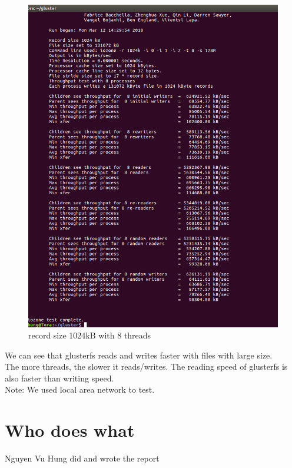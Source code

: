 \documentclass[12pt]{article}
\begin{document}
     \begin{figure}[H]
        \centering
       \includegraphics[scale=0.4]{1024kB 8 proccesses.png}
       \caption{record size 1024kB with 8 threads}
    \end{figure}
        We can see that glusterfs reads and writes faster with files with large size.\\
        The more threads, the slower it reads/writes. The reading speed of glusterfs is also faster than writing speed.
        \\ Note: We used local area network to test.
        
    \section{Who does what}
Nguyen Vu Hung did and wrote the report
\end{document}

